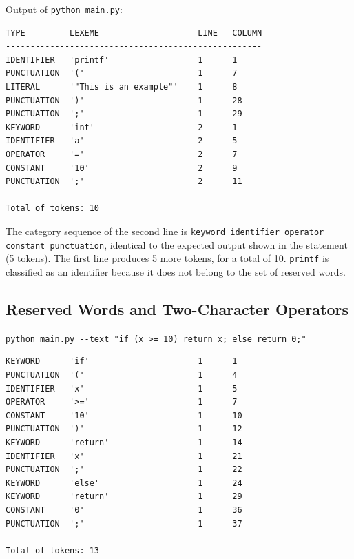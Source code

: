\documentclass[11pt,letterpaper]{article}
\newcommand{\tok}[1]{\texttt{#1}}
\begin{document}
\par\noindent\begin{minipage}{\linewidth}
Output of \tok{python main.py}:\par\smallskip
\begin{lstlisting}[style=console]
TYPE         LEXEME                    LINE   COLUMN
----------------------------------------------------
IDENTIFIER   'printf'                  1      1
PUNCTUATION  '('                       1      7
LITERAL      '"This is an example"'    1      8
PUNCTUATION  ')'                       1      28
PUNCTUATION  ';'                       1      29
KEYWORD      'int'                     2      1
IDENTIFIER   'a'                       2      5
OPERATOR     '='                       2      7
CONSTANT     '10'                      2      9
PUNCTUATION  ';'                       2      11

Total of tokens: 10
\end{lstlisting}
\end{minipage}\par\smallskip

The category sequence of the second line is
\tok{keyword identifier operator constant punctuation}, identical to the
expected output shown in the statement (5 tokens). The first line produces 5
more tokens, for a total of 10. \tok{printf} is classified as an identifier
because it does not belong to the set of reserved words.

\subsection{Reserved Words and Two-Character Operators}
\label{sec:reserved}

\par\noindent\begin{minipage}{\linewidth}
\tok{python main.py -{}-text "if (x >= 10) return x; else return 0;"}\par\smallskip
\begin{lstlisting}[style=console]
KEYWORD      'if'                      1      1
PUNCTUATION  '('                       1      4
IDENTIFIER   'x'                       1      5
OPERATOR     '>='                      1      7
CONSTANT     '10'                      1      10
PUNCTUATION  ')'                       1      12
KEYWORD      'return'                  1      14
IDENTIFIER   'x'                       1      21
PUNCTUATION  ';'                       1      22
KEYWORD      'else'                    1      24
KEYWORD      'return'                  1      29
CONSTANT     '0'                       1      36
PUNCTUATION  ';'                       1      37

Total of tokens: 13
\end{lstlisting}
\end{minipage}\par\smallskip
\end{document}
